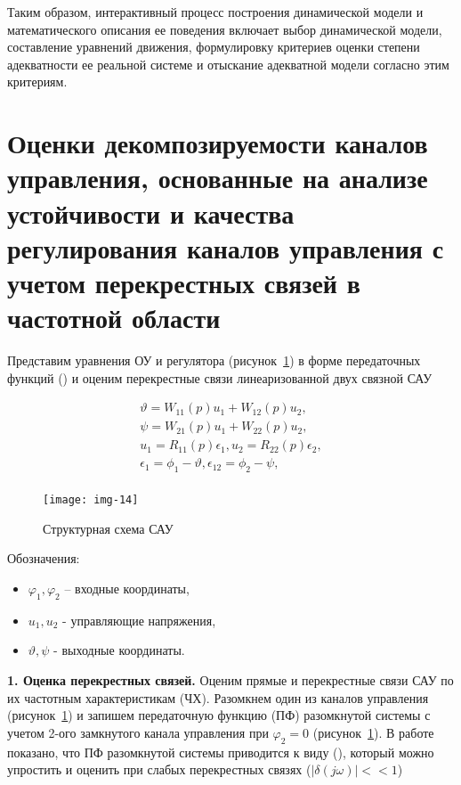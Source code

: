 Таким образом, интерактивный процесс построения динамической модели и математического описания ее поведения включает выбор динамической модели, составление уравнений движения, формулировку критериев оценки степени адекватности ее реальной системе и отыскание адекватной модели согласно этим критериям.


\section{Оценки декомпозируемости каналов управления, основанные на анализе устойчивости и качества регулирования каналов управления с учетом перекрестных связей в частотной области} \label{sec:ch2/sec5}

Представим уравнения ОУ и регулятора (рисунок~\ref{fig:img-14}) в форме передаточных функций () и оценим перекрестные связи линеаризованной двух связной САУ 

\begin{equation}
\label{eq:p2:11-}
\begin{alignedat}{4}
\vartheta{}=W_{11}(p)u_1+W_{12}\left(p\right)u_2 ,\\
\psi{}=W_{21}(p)u_1+W_{22}\left(p\right)u_2 ,\\
u_1=R_{11}(p){\epsilon{}}_1,u_2=R_{22}(p){\epsilon{}}_2 ,\\
{\epsilon{}}_1={\phi{}}_1-\vartheta{},{\epsilon{}}_{12}={\phi{}}_2-\psi{} ,\\
\end{alignedat}
\end{equation}

\begin{figure}[ht]
	\centering
	\texttt{[image: img-14]} 
	\caption{Структурная схема САУ}
	\label{fig:img-14}
\end{figure}

Обозначения: 
\begin{itemize}
	\item $\varphi_1, \varphi_2$ – входные координаты,
	\item $u_1, u_2$ - управляющие напряжения,
	\item $\vartheta,\psi$ - выходные координаты.
\end{itemize}
 
\textbf{1. Оценка перекрестных связей.} \label{sec:ch2/sec5/s1}
Оценим прямые и перекрестные связи САУ по их частотным характеристикам (ЧХ). 
Разомкнем один из каналов управления (рисунок~\ref{fig:img-14}) и запишем передаточную функцию (ПФ) разомкнутой системы с учетом 2-ого замкнутого канала управления при $\varphi_2=0$ (рисунок~\ref{fig:img-14}). 
В работе \cite[]{Karpov} показано, что ПФ разомкнутой системы приводится к виду (), который можно упростить и оценить при слабых перекрестных связях ($\left| \delta(j\omega) \right| <<1$) 

